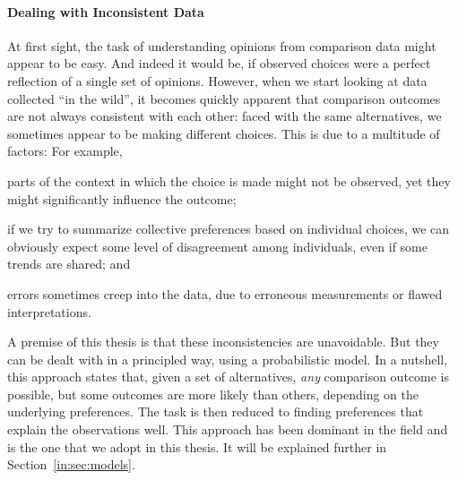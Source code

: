 \paragraph{Dealing with Inconsistent Data}
At first sight, the task of understanding opinions from comparison data might appear to be easy.
And indeed it would be, if observed choices were a perfect reflection of a single set of opinions.
However, when we start looking at data collected ``in the wild'', it becomes quickly apparent that comparison outcomes are not always consistent with each other:
faced with the same alternatives, we sometimes appear to be making different choices.
This is due to a multitude of factors:
For example,
\begin{enuminline}
\item parts of the context in which the choice is made might not be observed, yet they might significantly influence the outcome;
\item if we try to summarize collective preferences based on individual choices, we can obviously expect some level of disagreement among individuals, even if some trends are shared; and
\item errors sometimes creep into the data, due to erroneous measurements or flawed interpretations.
\end{enuminline}
A premise of this thesis is that these inconsistencies are unavoidable.
But they can be dealt with in a principled way, using a probabilistic model.
In a nutshell, this approach states that, given a set of alternatives, \emph{any} comparison outcome is possible, but some outcomes are more likely than others, depending on the underlying preferences.
The task is then reduced to finding preferences that explain the observations well.
This approach has been dominant in the field and is the one that we adopt in this thesis.
It will be explained further in Section~\ref{in:sec:models}.

